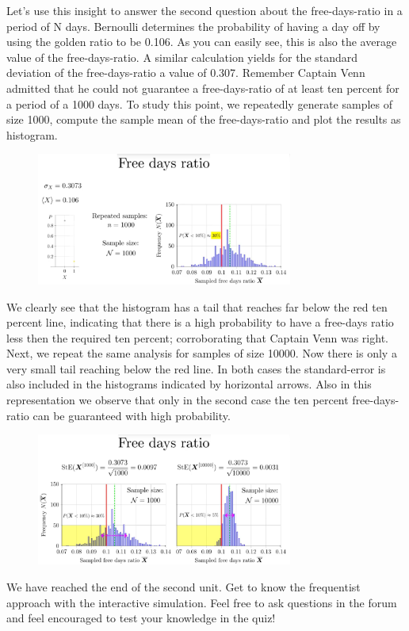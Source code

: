 \documentclass[12pt, a4paper]{scrartcl}
\begin{document}
Let's use this insight to answer the second question about the free-days-ratio in a period of N days.
Bernoulli determines the probability of having a day off by using the golden ratio to be 0.106. 
As you can easily see, this is also the average value of the free-days-ratio.
A similar calculation yields for the standard deviation of the free-days-ratio a value of 0.307.
Remember Captain Venn admitted that he could not guarantee a free-days-ratio of at least ten percent for a period of a 1000 days.
To study this point, we repeatedly generate samples of size 1000, compute the sample mean of the free-days-ratio and plot the results as histogram.\begin{figure}[H]
	\centering
	\includegraphics[width=0.75\textwidth]{2_12.png}
\end{figure}
We clearly see that the histogram has a tail that reaches far below the red ten percent line, indicating that there is a high probability to have a free-days ratio less then the required ten percent; corroborating that Captain Venn was right.
Next, we repeat the same analysis for samples of size 10000. Now there is only a very small tail reaching below the red line.
In both cases the standard-error is also included in the histograms indicated by horizontal arrows. Also in this representation we observe that only in the second case the ten percent free-days-ratio can be guaranteed with high probability.\\
\begin{figure}[H]
	\centering
	\includegraphics[width=0.75\textwidth]{2_13.png}
\end{figure}
We have reached the end of the second unit. 
Get to know the frequentist approach with the interactive simulation.
Feel free to ask questions in the forum and feel encouraged to test your knowledge in the quiz!
\end{document}
